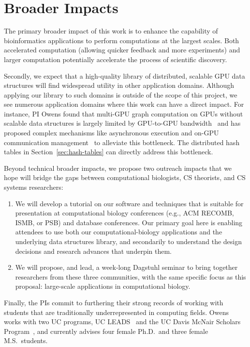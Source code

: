 \section{Broader Impacts}
\label{broadimpacts}

The primary broader impact of this work is to enhance the capability of bioinformatics applications to perform computations at the largest scales. Both accelerated computation (allowing quicker feedback and more experiments) and larger computation potentially accelerate the process of scientific discovery. 

Secondly, we expect that a high-quality library of distributed, scalable GPU data structures will find widespread utility in other application domains. Although applying our library to such domains is outside of the scope of this project, we see numerous application domains where this work can have a direct impact. For instance, PI Owens found that multi-GPU graph computation on GPUs without scalable data structures is largely limited by GPU-to-GPU bandwidth~\cite{Pan:2017:MGA} and has proposed complex mechanisms like asynchronous execution and on-GPU communication management~\cite{Chen:2022:SIP} to alleviate this bottleneck. The distributed hash tables in Section~\ref{sec:hash-tables} can directly address this bottleneck.

Beyond technical broader impacts, we propose two outreach impacts that we hope will bridge the gaps between computational biologists, CS theorists, and CS systems researchers:

\begin{enumerate}[noitemsep]
  \item We will develop a tutorial on our software and techniques that is suitable for presentation at computational biology conferences (e.g., ACM RECOMB, ISMB, or PSB) and database conferences. Our primary goal here is enabling attendees to use both our computational-biology applications and the underlying data structures library, and secondarily to understand the design decisions and research advances that underpin them.
  \item We will propose, and lead, a week-long Dagstuhl seminar to bring together researchers from these three communities, with the same specific focus as this proposal: large-scale applications in computational biology.
\end{enumerate}

Finally, the PIs commit to furthering their strong records of working with students that are traditionally underrepresented in computing fields. Owens works with two UC programs, UC LEADS~\cite{UCLeads:2003:WEB} and the UC Davis McNair Scholars Program~\cite{McNair:2003:WEB}, and currently advises four female Ph.D.\ and three female M.S.\ students.

